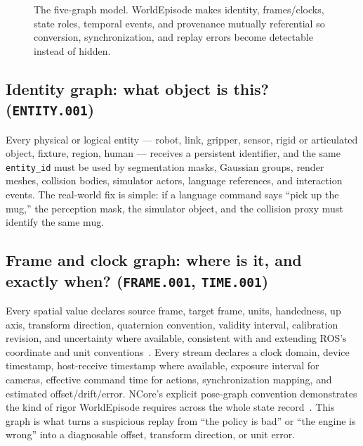 \begin{figure}[t]
{%
}
\caption{The five-graph model. WorldEpisode makes identity, frames/clocks, state roles, temporal events, and
provenance mutually referential so conversion, synchronization, and replay errors become detectable
instead of hidden.}
\label{fig:five-graph-model}
\end{figure}

\subsection{Identity graph: what object is this? (\texttt{ENTITY.001})}

Every physical or logical entity --- robot, link, gripper, sensor, rigid or articulated object,
fixture, region, human --- receives a persistent identifier, and the same \texttt{entity\_id} must
be used by segmentation masks, Gaussian groups, render meshes, collision bodies, simulator actors,
language references, and interaction events. The real-world fix is simple: if a language command
says ``pick up the mug,'' the perception mask, the simulator object, and the collision proxy must
identify the same mug.

\subsection{Frame and clock graph: where is it, and exactly when? (\texttt{FRAME.001}, \texttt{TIME.001})}

Every spatial value declares source frame, target frame, units, handedness, up axis, transform
direction, quaternion convention, validity interval, calibration revision, and uncertainty where
available, consistent with and extending ROS's coordinate and unit conventions~\citep{rosrep103}. Every stream declares a clock domain, device timestamp, host-receive timestamp where
available, exposure interval for cameras, effective command time for actions, synchronization
mapping, and estimated offset/drift/error. NCore's explicit pose-graph convention demonstrates the
kind of rigor WorldEpisode requires across the whole state record~\citep{ncore}. This graph is what turns a
suspicious replay from ``the policy is bad'' or ``the engine is wrong'' into a diagnosable offset,
transform direction, or unit error.


